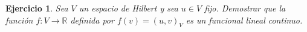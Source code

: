\documentclass[11pt]{report}
\newtheorem{ex}{Ejercicio}
\newenvironment{solution}{\begin{proof}[Solución]}{\end{proof}}
\newcommand{\inner}[2]{( #1, #2 )_V}
\newcommand{\norma}[1]{\Vert #1 \Vert_V}
\begin{document}

\begin{ex}
Sea $V$ un espacio de Hilbert y sea $u \in V$ fijo. Demostrar que la función $f: V \to \mathbb{R}$ definida por $f(v) = \inner{u}{v}$ es un funcional lineal continuo.
\end{ex}

%
%
%
%
%







\end{document}
